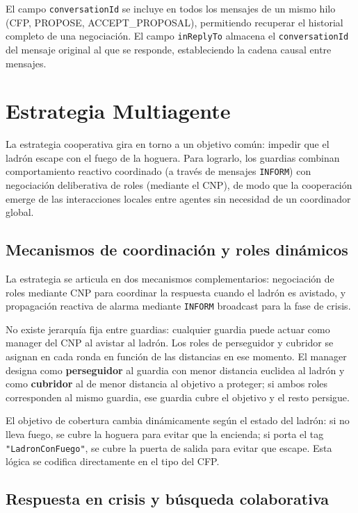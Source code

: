 \documentclass[a4paper,12pt]{article}
\begin{document}
El campo \texttt{conversationId} se incluye en todos los mensajes de un mismo 
hilo (CFP, PROPOSE, ACCEPT\_PROPOSAL), permitiendo recuperar el historial 
completo de una negociación. El campo \texttt{inReplyTo} almacena el 
\texttt{conversationId} del mensaje original al que se responde, estableciendo 
la cadena causal entre mensajes.

\section{Estrategia Multiagente}

La estrategia cooperativa gira en torno a un objetivo común: impedir que el
ladrón escape con el fuego de la hoguera. Para lograrlo, los guardias combinan
comportamiento reactivo coordinado (a través de mensajes \texttt{INFORM}) con
negociación deliberativa de roles (mediante el CNP), de modo que la cooperación
emerge de las interacciones locales entre agentes sin necesidad de un
coordinador global.

\subsection{Mecanismos de coordinación y roles dinámicos}

La estrategia se articula en dos mecanismos complementarios: negociación de
roles mediante CNP para coordinar la respuesta cuando el ladrón es avistado, y
propagación reactiva de alarma mediante \texttt{INFORM} broadcast para la fase
de crisis.

No existe jerarquía fija entre guardias: cualquier guardia puede actuar como
manager del CNP al avistar al ladrón. Los roles de perseguidor y cubridor se
asignan en cada ronda en función de las distancias en ese momento. El manager
designa como \textbf{perseguidor} al guardia con menor distancia euclidea al
ladrón y como \textbf{cubridor} al de menor distancia al objetivo a proteger;
si ambos roles corresponden al mismo guardia, ese guardia cubre el objetivo y
el resto persigue.

El objetivo de cobertura cambia dinámicamente según el estado del ladrón: si no
lleva fuego, se cubre la hoguera para evitar que la encienda; si porta el tag
\texttt{"LadronConFuego"}, se cubre la puerta de salida para evitar que escape.
Esta lógica se codifica directamente en el tipo del CFP.

\subsection{Respuesta en crisis y búsqueda colaborativa}
\end{document}
